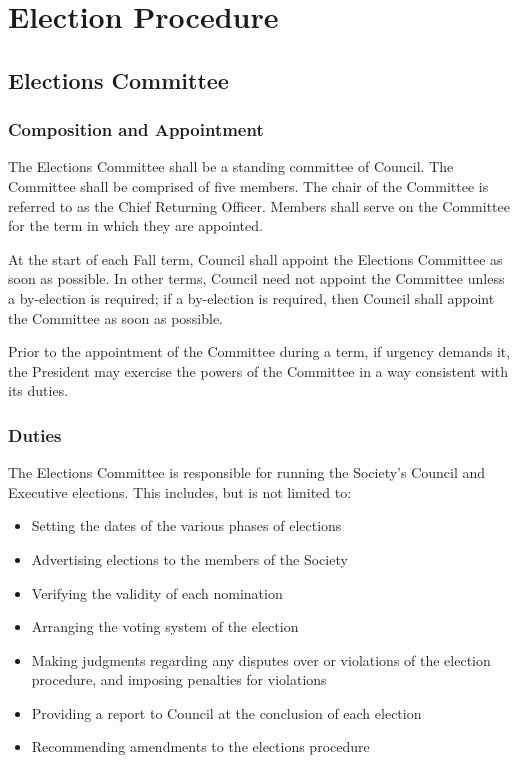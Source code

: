 \section{Election Procedure}
\subsection{Elections Committee}
\subsubsection{Composition and Appointment}
The Elections Committee shall be a standing committee of Council. The
Committee shall be comprised of five members. The chair of the Committee is
referred to as the Chief Returning Officer. Members shall serve on the Committee
for the term in which they are appointed.

At the start of each Fall term, Council shall appoint the Elections Committee as
soon as possible. In other terms, Council need not appoint the Committee unless
a by-election is required; if a by-election is required, then Council shall
appoint the Committee as soon as possible.

Prior to the appointment of the Committee during a term, if urgency demands it,
the President may exercise the powers of the Committee in a way consistent with
its duties.

\subsubsection{Duties}
The Elections Committee is responsible for running the Society's Council and 
Executive elections. This includes, but is not limited to:
\begin{itemize}
\item Setting the dates of the various phases of elections
\item Advertising elections to the members of the Society
\item Verifying the validity of each nomination
\item Arranging the voting system of the election
\item Making judgments regarding any disputes over or violations of the election
procedure, and imposing penalties for violations
\item Providing a report to Council at the conclusion of each election
\item Recommending amendments to the elections procedure
\end{itemize}

